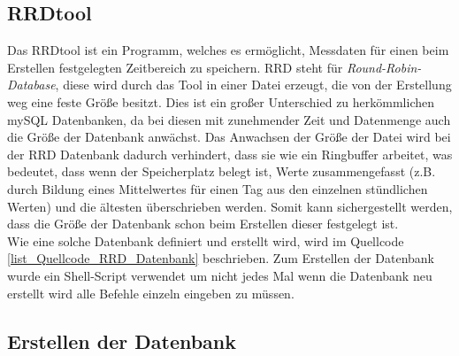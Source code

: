 \subsection*{RRDtool}
Das RRDtool ist ein Programm, welches es ermöglicht, Messdaten für einen beim Erstellen festgelegten Zeitbereich zu speichern. RRD steht für \textit{Round-Robin-Database}, diese wird durch das Tool in einer Datei erzeugt, die von der Erstellung weg eine feste Größe besitzt. Dies ist ein großer Unterschied zu herkömmlichen mySQL Datenbanken, da bei diesen mit zunehmender Zeit und Datenmenge auch die Größe der Datenbank anwächst. Das Anwachsen der Größe der Datei wird bei der RRD Datenbank dadurch verhindert, dass sie wie ein Ringbuffer arbeitet, was bedeutet, dass wenn der Speicherplatz belegt ist, Werte zusammengefasst (z.B. durch Bildung eines Mittelwertes für einen Tag aus den einzelnen stündlichen Werten) und die ältesten überschrieben werden. Somit kann sichergestellt werden, dass die Größe der Datenbank schon beim Erstellen dieser festgelegt ist.\\
Wie eine solche Datenbank definiert und erstellt wird, wird im Quellcode \ref{list_Quellcode_RRD_Datenbank} beschrieben. Zum Erstellen der Datenbank wurde ein Shell-Script verwendet um nicht jedes Mal wenn die Datenbank neu erstellt wird alle Befehle einzeln eingeben zu müssen.

\subsection*{Erstellen der Datenbank}
\label{subsection_Erstellen_DB_DS18S20}



